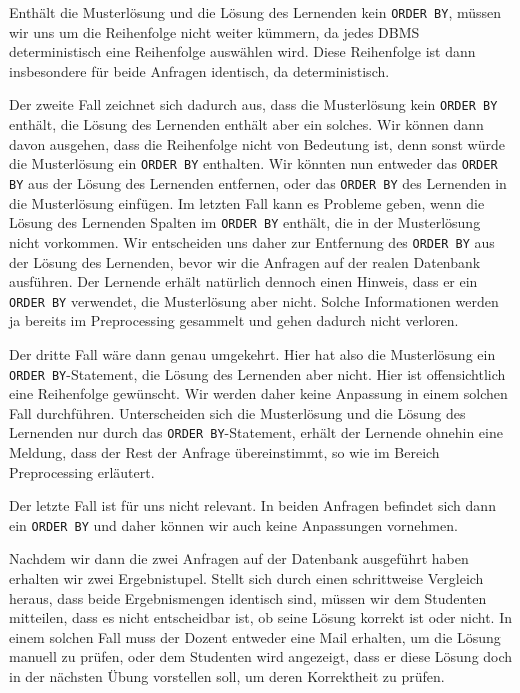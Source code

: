 Enthält die Musterlösung und die Lösung des Lernenden kein \verb|ORDER BY|, müssen wir uns um die Reihenfolge nicht weiter kümmern, da jedes DBMS deterministisch eine Reihenfolge auswählen wird. Diese Reihenfolge ist dann insbesondere für beide Anfragen identisch, da deterministisch.

Der zweite Fall zeichnet sich dadurch aus, dass die Musterlösung kein \verb|ORDER BY| enthält, die Lösung des Lernenden enthält aber ein solches. Wir können dann davon ausgehen, dass die Reihenfolge nicht von Bedeutung ist, denn sonst würde die Musterlösung ein \verb|ORDER BY| enthalten. Wir könnten nun entweder das \verb|ORDER BY| aus der Lösung des Lernenden entfernen, oder das \verb|ORDER BY| des Lernenden in die Musterlösung einfügen. Im letzten Fall kann es Probleme geben, wenn die Lösung des Lernenden Spalten im \verb|ORDER BY| enthält, die in der Musterlösung nicht vorkommen. Wir entscheiden uns daher zur Entfernung des \verb|ORDER BY| aus der Lösung des Lernenden, bevor wir die Anfragen auf der realen Datenbank ausführen. Der Lernende erhält natürlich dennoch einen Hinweis, dass er ein \verb|ORDER BY| verwendet, die Musterlösung aber nicht. Solche Informationen werden ja bereits im Preprocessing gesammelt und gehen dadurch nicht verloren.

Der dritte Fall wäre dann genau umgekehrt. Hier hat also die Musterlösung ein \verb|ORDER BY|-Statement, die Lösung des Lernenden aber nicht. Hier ist offensichtlich eine Reihenfolge gewünscht. Wir werden daher keine Anpassung in einem solchen Fall durchführen. Unterscheiden sich die Musterlösung und die Lösung des Lernenden nur durch das \verb|ORDER BY|-Statement, erhält der Lernende ohnehin eine Meldung, dass der Rest der Anfrage übereinstimmt, so wie im Bereich Preprocessing erläutert.

Der letzte Fall ist für uns nicht relevant. In beiden Anfragen befindet sich dann ein \verb|ORDER BY| und daher können wir auch keine Anpassungen vornehmen. 

Nachdem wir dann die zwei Anfragen auf der Datenbank ausgeführt haben erhalten wir zwei Ergebnistupel. Stellt sich durch einen schrittweise Vergleich heraus, dass beide Ergebnismengen identisch sind, müssen wir dem Studenten mitteilen, dass es nicht entscheidbar ist, ob seine Lösung korrekt ist oder nicht. In einem solchen Fall muss der Dozent entweder eine Mail erhalten, um die Lösung manuell zu prüfen, oder dem Studenten wird angezeigt, dass er diese Lösung doch in der nächsten Übung vorstellen soll, um deren Korrektheit zu prüfen.

